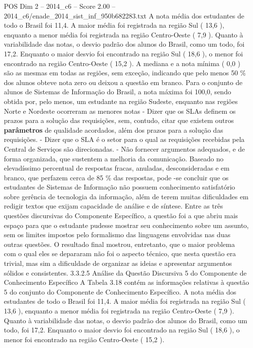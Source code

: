 \begin{textsample}{POS Dim 2 – 2014\_c6 – Score 2.00 – 2014\_c6/enade\_2014\_sist\_inf\_950b682283.txt}
A nota média dos estudantes de todo o Brasil foi 11,4.
A maior média foi registrada na região Sul ( 13,6 ), enquanto a menor média foi registrada na região Centro-Oeste ( 7,9 ).
Quanto à variabilidade das notas, o desvio padrão dos alunos do Brasil, como um todo, foi 17,2.
Enquanto o maior desvio foi encontrado na região Sul ( 18,6 ), o menor foi encontrado na região Centro-Oeste ( 15,2 ).
A mediana e a nota mínima ( 0,0 ) são as mesmas em todas as regiões, sem exceção, indicando que pelo menos 50 \% dos alunos obteve nota zero ou deixou a questão em branco.
Para o conjunto de alunos de Sistemas de Informação do Brasil, a nota máxima foi 100,0, sendo obtida por, pelo menos, um estudante na região Sudeste, enquanto nas regiões Norte e Nordeste ocorreram as menores notas - Dizer que os SLAs definem os prazos para a solução das requisições, sem, contudo, citar que existem outros \textbf{parâmetros} de qualidade acordados, além dos prazos para a solução das requisições. - Dizer que o SLA é o setor para o qual as requisições recebidas pela Central de Serviços são direcionadas. - Não fornecer argumentos adequados, e de forma organizada, que sustentem a melhoria da comunicação.
Baseado no elevadíssimo percentual de respostas fracas, anuladas, desconsideradas e em branco, que perfazem cerca de 85 \% das respostas, pode -se concluir que os estudantes de Sistemas de Informação não possuem conhecimento satisfatório sobre gerência de tecnologia da informação, além de terem muitas dificuldades em redigir textos que exijam capacidade de análise e de síntese.
Entre as três questões discursivas do Componente Específico, a questão foi a que abriu mais espaço para que o estudante pudesse mostrar seu conhecimento sobre um assunto, sem os limites impostos pelo formalismo das linguagens envolvidas nas duas outras questões.
O resultado final mostrou, entretanto, que o maior problema com o qual eles se depararam não foi o aspecto técnico, que nesta questão era trivial, mas sim a dificuldade de organizar as ideias e apresentar argumentos sólidos e consistentes. 3.3.2.5 Análise da Questão Discursiva 5 do Componente de Conhecimento Específico A Tabela 3.18 contém as informações relativas à questão 5 do conjunto do Componente de Conhecimento Específico.
A nota média dos estudantes de todo o Brasil foi 11,4.
A maior média foi registrada na região Sul ( 13,6 ), enquanto a menor média foi registrada na região Centro-Oeste ( 7,9 ).
Quanto à variabilidade das notas, o desvio padrão dos alunos do Brasil, como um todo, foi 17,2.
Enquanto o maior desvio foi encontrado na região Sul ( 18,6 ), o menor foi encontrado na região Centro-Oeste ( 15,2 ).

\end{textsample}
